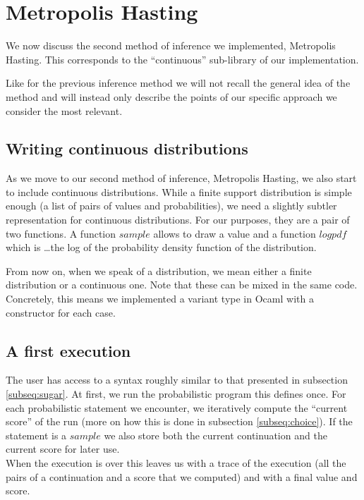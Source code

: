 \documentclass{article}
\begin{document}
\section{Metropolis Hasting}

	We now discuss the second method of inference we implemented, Metropolis Hasting.
	This corresponds to the ``continuous'' sub-library of our implementation.
	
	Like for the previous inference method we will not recall the general idea of the method and will instead only describe the points of our specific approach we consider the most relevant.

	\subsection{Writing continuous distributions}

	As we move to our second method of inference, Metropolis Hasting, we also start to include continuous distributions.
	While a finite support distribution is simple enough (a list of pairs of values and probabilities), we need a slightly subtler representation for continuous distributions.
	For our purposes, they are a pair of two functions. A function $sample$ allows to draw a value and a function $logpdf$ which is \dots the log of the probability density function of the distribution.

	From now on, when we speak of a distribution, we mean either a finite distribution or a continuous one. Note that these can be mixed in the same code.
	Concretely, this means we implemented a variant type in Ocaml with a constructor for each case.

	\subsection{A first execution}

	The user has access to a syntax roughly similar to that presented in subsection \ref{subseq:sugar}.
	At first, we run the probabilistic program this defines once.
	For each probabilistic statement we encounter, we iteratively compute the ``current score'' of the run (more on how this is done in subsection \ref{subseq:choice}).
	If the statement is a $sample$ we also store both the current continuation and the current score for later use. \\

	When the execution is over this leaves us with a trace of the execution (all the pairs of a continuation and a score that we computed) and with a final value and score. 
\end{document}
